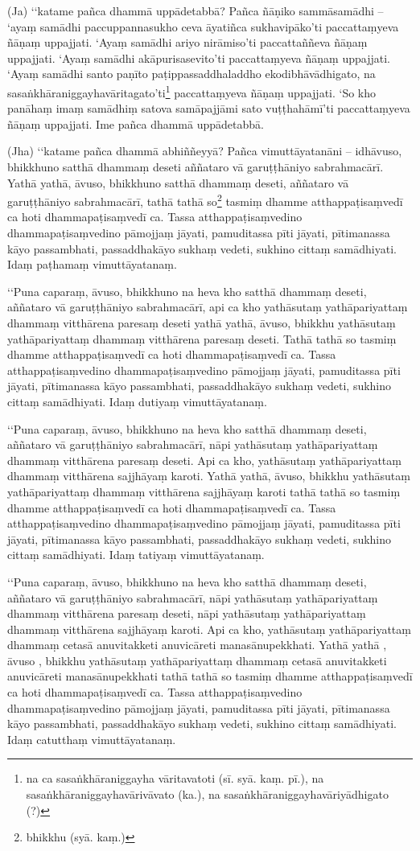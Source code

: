 (Ja) ‘‘katame pañca dhammā uppādetabbā? Pañca ñāṇiko sammāsamādhi – ‘ayaṃ samādhi paccuppannasukho ceva āyatiñca sukhavipāko’ti paccattaṃyeva ñāṇaṃ uppajjati. ‘Ayaṃ samādhi ariyo nirāmiso’ti paccattaññeva ñāṇaṃ uppajjati. ‘Ayaṃ samādhi akāpurisasevito’ti paccattaṃyeva ñāṇaṃ uppajjati. ‘Ayaṃ samādhi santo paṇīto paṭippassaddhaladdho ekodibhāvādhigato, na sasaṅkhāraniggayhavāritagato’ti\footnote{na ca sasaṅkhāraniggayha vāritavatoti (sī. syā. kaṃ. pī.), na sasaṅkhāraniggayhavārivāvato (ka.), na sasaṅkhāraniggayhavāriyādhigato (?)} paccattaṃyeva ñāṇaṃ uppajjati. ‘So kho panāhaṃ imaṃ samādhiṃ satova samāpajjāmi sato vuṭṭhahāmī’ti paccattaṃyeva ñāṇaṃ uppajjati. Ime pañca dhammā uppādetabbā.

(Jha) ‘‘katame pañca dhammā abhiññeyyā? Pañca vimuttāyatanāni – idhāvuso, bhikkhuno satthā dhammaṃ deseti aññataro vā garuṭṭhāniyo sabrahmacārī. Yathā yathā, āvuso, bhikkhuno satthā dhammaṃ deseti, aññataro vā garuṭṭhāniyo sabrahmacārī, tathā tathā so\footnote{bhikkhu (syā. kaṃ.)} tasmiṃ dhamme atthappaṭisaṃvedī ca hoti dhammapaṭisaṃvedī ca. Tassa atthappaṭisaṃvedino dhammapaṭisaṃvedino pāmojjaṃ jāyati, pamuditassa pīti jāyati, pītimanassa kāyo passambhati, passaddhakāyo sukhaṃ vedeti, sukhino cittaṃ samādhiyati. Idaṃ paṭhamaṃ vimuttāyatanaṃ.

‘‘Puna caparaṃ, āvuso, bhikkhuno na heva kho satthā dhammaṃ deseti, aññataro vā garuṭṭhāniyo sabrahmacārī, api ca kho yathāsutaṃ yathāpariyattaṃ dhammaṃ vitthārena paresaṃ deseti yathā yathā, āvuso, bhikkhu yathāsutaṃ yathāpariyattaṃ dhammaṃ vitthārena paresaṃ deseti. Tathā tathā so tasmiṃ dhamme atthappaṭisaṃvedī ca hoti dhammapaṭisaṃvedī ca. Tassa atthappaṭisaṃvedino dhammapaṭisaṃvedino pāmojjaṃ jāyati, pamuditassa pīti jāyati, pītimanassa kāyo passambhati, passaddhakāyo sukhaṃ vedeti, sukhino cittaṃ samādhiyati. Idaṃ dutiyaṃ vimuttāyatanaṃ.

‘‘Puna caparaṃ, āvuso, bhikkhuno na heva kho satthā dhammaṃ deseti, aññataro vā garuṭṭhāniyo sabrahmacārī, nāpi yathāsutaṃ yathāpariyattaṃ dhammaṃ vitthārena paresaṃ deseti. Api ca kho, yathāsutaṃ yathāpariyattaṃ dhammaṃ vitthārena sajjhāyaṃ karoti. Yathā yathā, āvuso, bhikkhu yathāsutaṃ yathāpariyattaṃ dhammaṃ vitthārena sajjhāyaṃ karoti tathā tathā so tasmiṃ dhamme atthappaṭisaṃvedī ca hoti dhammapaṭisaṃvedī ca. Tassa atthappaṭisaṃvedino dhammapaṭisaṃvedino pāmojjaṃ jāyati, pamuditassa pīti jāyati, pītimanassa kāyo passambhati, passaddhakāyo sukhaṃ vedeti, sukhino cittaṃ samādhiyati. Idaṃ tatiyaṃ vimuttāyatanaṃ.

‘‘Puna caparaṃ, āvuso, bhikkhuno na heva kho satthā dhammaṃ deseti, aññataro vā garuṭṭhāniyo sabrahmacārī, nāpi yathāsutaṃ yathāpariyattaṃ dhammaṃ vitthārena paresaṃ deseti, nāpi yathāsutaṃ yathāpariyattaṃ dhammaṃ vitthārena sajjhāyaṃ karoti. Api ca kho, yathāsutaṃ yathāpariyattaṃ dhammaṃ cetasā anuvitakketi anuvicāreti manasānupekkhati. Yathā yathā , āvuso , bhikkhu yathāsutaṃ yathāpariyattaṃ dhammaṃ cetasā anuvitakketi anuvicāreti manasānupekkhati tathā tathā so tasmiṃ dhamme atthappaṭisaṃvedī ca hoti dhammapaṭisaṃvedī ca. Tassa atthappaṭisaṃvedino dhammapaṭisaṃvedino pāmojjaṃ jāyati, pamuditassa pīti jāyati, pītimanassa kāyo passambhati, passaddhakāyo sukhaṃ vedeti, sukhino cittaṃ samādhiyati. Idaṃ catutthaṃ vimuttāyatanaṃ.

